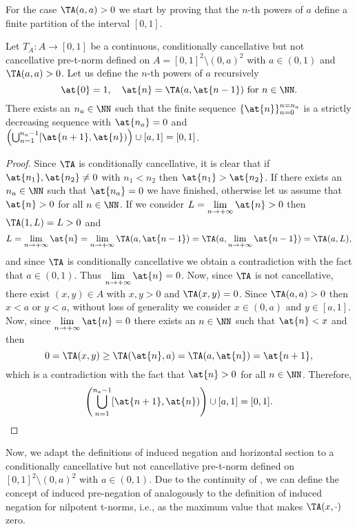 For the case $\TA(a,a)>0$ we start by proving that the $n$-th powers of $a$ define a finite partition of the interval $[0,1]$.

\begin{lemma}\label{lem:sequencePartitionCompletion(0,a)} Let $T_A: A \to [0,1]$ be a continuous, conditionally cancellative but not cancellative pre-t-norm defined on $A=[0,1]^2 \setminus (0,a)^2$ with $a \in (0,1)$ and $\TA(a,a)>0$. Let us define the $n$-th powers of $a$ recursively
	$$\at{0}=1, \quad \at{n}=\TA(a,\at{n-1}) \text{ for } n \in \NN.$$	
	There exists an $n_a \in \NN$ such that the finite sequence $\{\at{n}\}_{n=0}^{n=n_a}$ is a strictly decreasing sequence  with $\at{n_a}=0$ and $\left(\bigcup_{n=1}^{n_a-1} [\at{n+1},\at{n})\right) \cup [a,1] = [0,1]$.
\end{lemma}
\begin{proof}
	Since $\TA$ is conditionally cancellative, it is clear that if $\at{n_1},\at{n_2} \not = 0$ with $n_1<n_2$ then $\at{n_1}>\at{n_2}$. If there exists an $n_a \in \NN$ such that $\at{n_a}=0$ we have finished, otherwise let us assume that $\at{n}>0$ for all $n \in \NN$. If we consider $\displaystyle L=\lim_{n \to +\infty} \at{n}>0$ then $\TA(1,L)=L>0$ and
	$$L=\lim_{n \to + \infty} \at{n} = \lim_{n \to + \infty} \TA(a,\at{n-1}) = \TA(a,\lim_{n \to + \infty} \at{n-1}) = \TA(a,L),$$
	and since $\TA$ is conditionally cancellative we obtain a contradiction with the fact that $a \in (0,1)$. Thus $\displaystyle \lim_{n \to + \infty} \at{n} =0$. Now, since $\TA$ is not cancellative, there exist $(x,y) \in A$ with $x,y>0$ and $\TA(x,y)=0$. Since $\TA(a,a)>0$ then $x< a$ or $y < a$, without loss of generality we consider $x \in (0,a)$ and $y \in [a,1]$. Now, since $\displaystyle \lim_{n \to + \infty} \at{n} =0$ there exists an $n \in \NN$ such that $\at{n}<x$ and then
	$$0=\TA(x,y) \geq \TA(\at{n},a)=\TA(a,\at{n})=\at{n+1},$$
	which is a	contradiction with the fact that $\at{n}>0$ for all $n \in \NN$. Therefore,
	$$\left(\bigcup_{n=1}^{n_a-1} [\at{n+1},\at{n})\right) \cup [a,1] = [0,1].$$
\end{proof}

Now, we adapt the definitions of induced negation and horizontal section to a conditionally cancellative but not cancellative pre-t-norm defined on $[0,1]^2 \setminus (0,a)^2$ with $a \in (0,1)$. Due to the continuity of \TA, we can define the concept of induced pre-negation of \TA analogously to the definition of induced negation for nilpotent t-norms, i.e., as the maximum value that makes $\TA(x,\cdot)$ zero.


